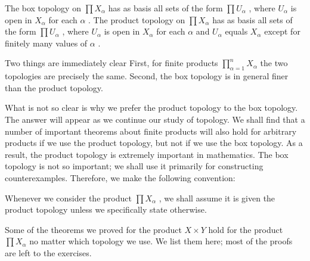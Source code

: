 \begin{theorem} The box topology on \(\prod {X}_{\alpha }\) has as basis all sets of the form \(\prod {U}_{\alpha }\) , where \({U}_{\alpha }\) is open in \({X}_{\alpha }\) for each \(\alpha\) . The product topology on \(\prod {X}_{\alpha }\) has as basis all sets of the form \(\prod {U}_{\alpha }\) , where \({U}_{\alpha }\) is open in \({X}_{\alpha }\) for each \(\alpha\) and \({U}_{\alpha }\) equals \({X}_{\alpha }\) except for finitely many values of \(\alpha\) .

Two things are immediately clear First, for finite products \(\mathop{\prod }\limits_{{\alpha  = 1}}^{n}{X}_{\alpha }\) the two topologies are precisely the same. Second, the box topology is in general finer than the product topology.

What is not so clear is why we prefer the product topology to the box topology. The answer will appear as we continue our study of topology. We shall find that a number of important theorems about finite products will also hold for arbitrary products if we use the product topology, but not if we use the box topology. As a result, the product topology is extremely important in mathematics. The box topology is not so important; we shall use it primarily for constructing counterexamples. Therefore, we make the following convention:

Whenever we consider the product \(\prod {X}_{\alpha }\) , we shall assume it is given the product topology unless we specifically state otherwise.

Some of the theorems we proved for the product \(X \times  Y\) hold for the product \(\prod {X}_{\alpha }\) no matter which topology we use. We list them here; most of the proofs are left to the exercises.

\end{theorem}
